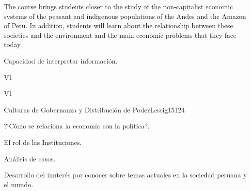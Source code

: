 \begin{syllabus}


\begin{justification}
The course brings students closer to the study of the non-capitalist economic systems of the peasant and indigenous populations of the Andes and the Amazon of Peru. In addition, students will learn about the relationship between these societies and the environment and the main economic problems that they face today.
\end{justification}

\begin{goals}
\item Capacidad de interpretar información.
\end{goals}

\begin{outcomes}{V1}
    \item {}
    \item {}
    \item {}
    
\end{outcomes}

\begin{competences}{V1}
    \item {}
    \item {}
    \item {}
    \item {}
\end{competences}

\begin{unit}{Culturas de Gobernanza y Distribución de Poder}{}{Lessig15}{12}{4}
   \begin{topics}
      \item ?`Cómo se relaciona la economía con la política?.
      \item El rol de las Instituciones.
      \item Análisis de casos.
   \end{topics}
   \begin{learningoutcomes}
      \item Desarrollo del innterés por conocer sobre temas actuales en la sociedad peruana y el mundo.
   \end{learningoutcomes}
\end{unit}

\begin{coursebibliography}
\end{coursebibliography}

\end{syllabus}

